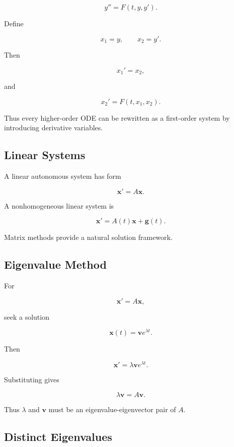 \[
y''=F(t,y,y').
\]

Define

\[
\boxed{
x_1=y,
\qquad
x_2=y'.
}
\]

Then

\[
\boxed{
x_1'=x_2,
}
\]

and

\[
\boxed{
x_2'
=
F(t,x_1,x_2).
}
\]

Thus every higher-order ODE can be rewritten as a first-order system by
introducing derivative variables.

\subsection{Linear Systems}
\label{subsec:linear-ode-systems}

A linear autonomous system has form

\[
\boxed{
\mathbf{x}'
=
A\mathbf{x}.
}
\]

A nonhomogeneous linear system is

\[
\boxed{
\mathbf{x}'
=
A(t)\mathbf{x}
+
\mathbf{g}(t).
}
\]

Matrix methods provide a natural solution framework.

\subsection{Eigenvalue Method}
\label{subsec:eigenvalue-method-ode}

For

\[
\mathbf{x}'
=
A\mathbf{x},
\]

seek a solution

\[
\boxed{
\mathbf{x}(t)
=
\mathbf{v}e^{\lambda t}.
}
\]

Then

\[
\mathbf{x}'
=
\lambda
\mathbf{v}e^{\lambda t}.
\]

Substituting gives

\[
\lambda
\mathbf{v}
=
A\mathbf{v}.
\]

Thus \(\lambda\) and \(\mathbf{v}\) must be an eigenvalue-eigenvector pair
of \(A\).

\subsection{Distinct Eigenvalues}
\label{subsec:distinct-eigenvalue-system}

